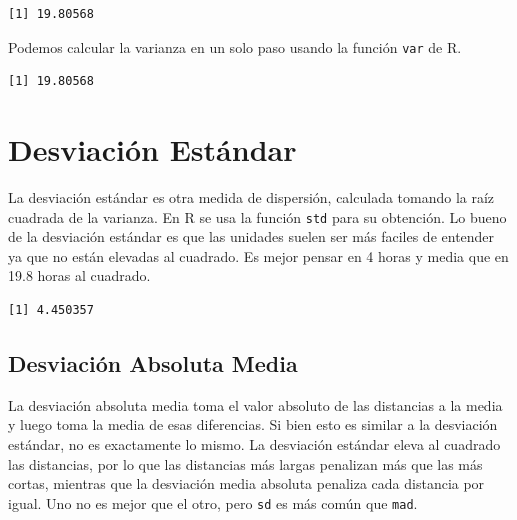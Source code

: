 \documentclass[
  letterpaper,
  DIV=11,
  numbers=noendperiod]{scrreprt}
\newenvironment{Shaded}{\begin{snugshade}}{\end{snugshade}}
\newcommand{\FunctionTok}[1]{\textcolor[rgb]{0.28,0.35,0.67}{#1}}
\newcommand{\NormalTok}[1]{\textcolor[rgb]{0.00,0.23,0.31}{#1}}
\newcommand{\SpecialCharTok}[1]{\textcolor[rgb]{0.37,0.37,0.37}{#1}}
\begin{document}
\begin{verbatim}
[1] 19.80568
\end{verbatim}

\hfill\break
Podemos calcular la varianza en un solo paso usando la función
\texttt{var} de R.

\begin{Shaded}
\end{Shaded}

\begin{verbatim}
[1] 19.80568
\end{verbatim}

\hypertarget{desviaciuxf3n-estuxe1ndar}{%
\section{Desviación Estándar}\label{desviaciuxf3n-estuxe1ndar}}

La desviación estándar es otra medida de dispersión, calculada tomando
la raíz cuadrada de la varianza. En R se usa la función \texttt{std}
para su obtención. Lo bueno de la desviación estándar es que las
unidades suelen ser más faciles de entender ya que no están elevadas al
cuadrado. Es mejor pensar en 4 horas y media que en 19.8 horas al
cuadrado.

\begin{Shaded}
\end{Shaded}

\begin{verbatim}
[1] 4.450357
\end{verbatim}

\hypertarget{desviaciuxf3n-absoluta-media}{%
\subsection{Desviación Absoluta
Media}\label{desviaciuxf3n-absoluta-media}}

La desviación absoluta media toma el valor absoluto de las distancias a
la media y luego toma la media de esas diferencias. Si bien esto es
similar a la desviación estándar, no es exactamente lo mismo. La
desviación estándar eleva al cuadrado las distancias, por lo que las
distancias más largas penalizan más que las más cortas, mientras que la
desviación media absoluta penaliza cada distancia por igual. Uno no es
mejor que el otro, pero \texttt{sd} es más común que \texttt{mad}.
\end{document}

